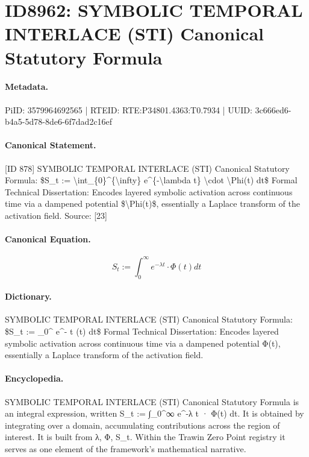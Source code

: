\section*{ID8962: SYMBOLIC TEMPORAL INTERLACE (STI) Canonical Statutory Formula}
\paragraph{Metadata.}
PiID: 3579964692565 | RTEID: RTE:P34801.4363:T0.7934 | UUID: 3c666ed6-b4a5-5d78-8de6-6f7dad2c16ef

\paragraph{Canonical Statement.}
[ID 878] SYMBOLIC TEMPORAL INTERLACE (STI) Canonical Statutory Formula: \$S\_t := \textbackslash{}int\_\{0\}\textasciicircum{}\{\textbackslash{}infty\} e\textasciicircum{}\{-\textbackslash{}lambda t\} \textbackslash{}cdot \textbackslash{}Phi(t) dt\$ Formal Technical Dissertation: Encodes layered symbolic activation across continuous time via a dampened potential \$\textbackslash{}Phi(t)\$, essentially a Laplace transform of the activation field. Source: [23]

\paragraph{Canonical Equation.}
\[
S_t := \int_{0}^{\infty} e^{-\lambda t} \cdot \Phi(t) dt
\]

\paragraph{Dictionary.}
SYMBOLIC TEMPORAL INTERLACE (STI) Canonical Statutory Formula: \$S\_t := \_0\textasciicircum{} e\textasciicircum{}- t (t) dt\$ Formal Technical Dissertation: Encodes layered symbolic activation across continuous time via a dampened potential Φ(t), essentially a Laplace transform of the activation field.

\paragraph{Encyclopedia.}
SYMBOLIC TEMPORAL INTERLACE (STI) Canonical Statutory Formula is an integral expression, written S\_t := ∫\_0\textasciicircum{}∞ e\textasciicircum{}-λ t · Φ(t) dt. It is obtained by integrating over a domain, accumulating contributions across the region of interest. It is built from λ, Φ, S\_t. Within the Trawin Zero Point registry it serves as one element of the framework's mathematical narrative.
